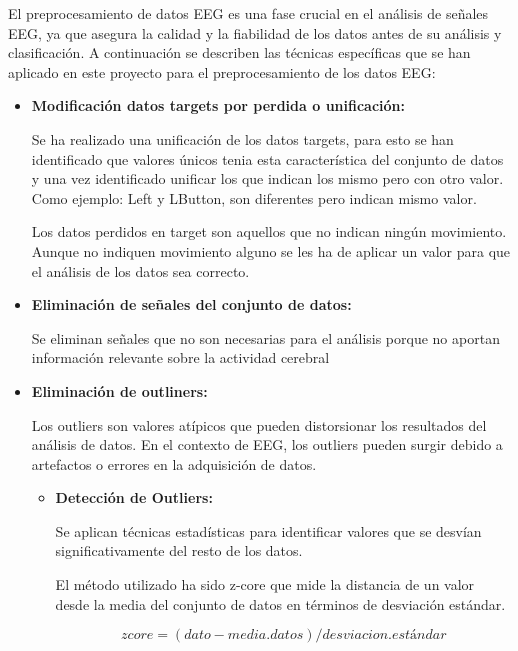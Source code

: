 El preprocesamiento de datos EEG es una fase crucial en el análisis de señales EEG, ya que asegura la calidad y la fiabilidad de los datos antes de su análisis y clasificación. A continuación se describen las técnicas específicas que se han aplicado en este proyecto para el preprocesamiento de los datos EEG:

\begin{itemize}

	\item
	\textbf{Modificación datos targets por perdida o unificación:}	
	
	
	Se ha realizado una unificación de los datos targets, para esto se han identificado que valores únicos tenia esta característica del conjunto de datos y una vez identificado unificar los que indican los mismo pero con otro valor. Como ejemplo: Left y LButton, son diferentes pero indican mismo valor.
	
	Los datos perdidos en target son aquellos que no indican ningún movimiento. Aunque no indiquen movimiento alguno se les ha de aplicar un valor para que  el análisis de los datos sea correcto. 


	\item
	\textbf{Eliminación de señales del conjunto de datos:}
	
	Se eliminan señales que no son necesarias para el análisis porque no aportan información relevante sobre la actividad cerebral

	
	\item
	\textbf{Eliminación de outliners:}
	
	Los outliers son valores atípicos que pueden distorsionar los resultados del análisis de datos. En el contexto de EEG, los outliers pueden surgir debido a artefactos o errores en la adquisición de datos.
	\begin{itemize}
	
	\item
	\textbf{Detección de Outliers:}
	
	Se aplican técnicas estadísticas para identificar valores que se desvían significativamente del resto de los datos. 
	
	
	El método utilizado ha sido z-core que mide la distancia de un valor desde la media del conjunto de datos en términos de desviación estándar.
	
	\begin{equation*}
	zcore = (dato - media.datos) / desviacion.estándar
	\end{equation*}


\end{itemize}
\end{itemize}
